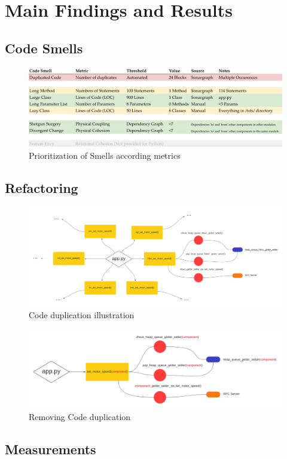 \chapter{Main Findings and Results}

\section{Code Smells}
\begin{figure}[htp]
    \centering
    \includegraphics[width=\textwidth]{./assets/prioritized_smells}
    \caption{Prioritization of Smells according metrics}
\end{figure}
\section{Refactoring}
\begin{figure}[htp]
    \centering
    \includegraphics[width=\textwidth]{./assets/board_extended}
    \caption{Code duplication illustration}
\end{figure}

\begin{figure}[htp]
    \centering
    \includegraphics[width=\textwidth]{./assets/board_simplified}
    \caption{Removing Code duplication}
\end{figure}
\section{Measurements}